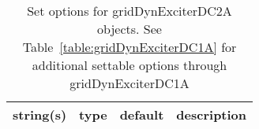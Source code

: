 \begin{table}[ht]
\centering
\begin{tabular}{p{5cm} c c p{7cm}}
\hline
string(s) & type & default & description \\
\hline
\hline
\end{tabular}
\caption{Set options for gridDynExciterDC2A objects. See Table~\ref{table:gridDynExciterDC1A} for additional settable options through gridDynExciterDC1A}
\label{table:gridDynExciterDC2A}
\end{table}

